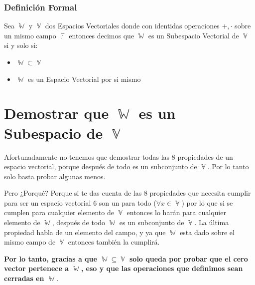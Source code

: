 \documentclass[12pt, fleqn]{report}                             %
\theoremstyle{break}                                            %
\DeclareMathOperator \GenericField {\mathbb{F}}                 %
\DeclareMathOperator \VectorSet    {\mathbb{V}}                 %
\DeclareMathOperator \SubVectorSet {\mathbb{W}}                 %
\begin{document}
            \subsubsection{Definición Formal}
                Sea $\SubVectorSet$ y $\VectorSet$ dos Espacios Vectoriales donde con identidas
                operaciones $+, \cdot$ sobre un mismo campo $\GenericField$ entonces decimos
                que $\SubVectorSet$ es un Subespacio Vectorial de $\VectorSet$ si y solo si:

                \begin{itemize}
                    \item $\SubVectorSet \subset \VectorSet$
                    \item $\SubVectorSet$ es un Espacio Vectorial por si mismo
                \end{itemize}


        \clearpage
        \section{Demostrar que $\SubVectorSet$ es un Subespacio de $\VectorSet$}

            Afortunadamente no tenemos que demostrar todas las 8 propiedades de un espacio
            vectorial, porque después de todo es un subconjunto de $\VectorSet$. Por lo tanto
            solo basta probar algunas menos.

            Pero ¿Porqué? Porque si te das cuenta de las 8 propiedades que necesita cumplir
            para ser un espacio vectorial 6 son un para todo ($\forall x \in \VectorSet$) por
            lo que si se cumplen para cualquier elemento de $\VectorSet$ entonces lo harán
            para cualquier elemento de $\SubVectorSet$, después de todo $\SubVectorSet$ es
            un subconjunto de $\VectorSet$.
            La última propiedad habla de un elemento del campo, y ya que $\SubVectorSet$ esta
            dado sobre el mismo campo de $\VectorSet$ entonces también la cumplirá.

            \textbf{
            Por lo tanto, gracias a que $\SubVectorSet \subseteq \VectorSet$ solo queda por
            probar que el cero vector pertenece a $\SubVectorSet$, eso y que las operaciones
            que definimos sean cerradas en $\SubVectorSet$}.
\end{document}
